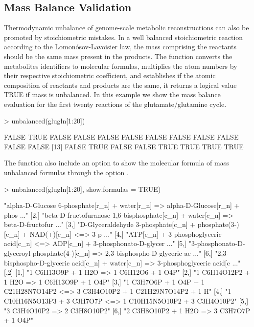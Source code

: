 \subsection{Mass Balance Validation}
Thermodynamic unbalance of genome-scale metabolic reconstructions can also be promoted by stoichiometric mistakes. In a well balanced stoichiometric reaction according to the Lomonósov-Lavoisier law, the mass comprising the reactants should be the same mass present in the products. The  function converts the metabolites identifiers to molecular formulas, multiplies the atom numbers by their respective stoichiometric coefficient, and establishes  if the atomic composition of reactants and products are the same, it returns a logical value TRUE if mass is unbalanced. In this example we show the mass balance evaluation for the first twenty reactions of the glutamate/glutamine cycle.
\begin{Schunk}
\begin{Sinput}
> unbalanced(glugln[1:20])
\end{Sinput}
\begin{Soutput}
 [1] FALSE  TRUE FALSE FALSE FALSE FALSE FALSE FALSE FALSE FALSE FALSE FALSE
[13] FALSE  TRUE FALSE FALSE  TRUE  TRUE  TRUE  TRUE
\end{Soutput}
The  function also include an option to show the molecular formula of mass unbalanced formulas through the option .
\begin{Sinput}
> unbalanced(glugln[1:20], show.formulas = TRUE)
\end{Sinput}
\begin{Soutput}
     [,1]                                                                                                                                                  
[1,] "alpha-D-Glucose 6-phosphate[r_n] + water[r_n] => alpha-D-Glucose[r_n] + phos ..."                                                          
[2,] "beta-D-fructofuranose 1,6-bisphosphate[c_n] + water[c_n] => beta-D-fructofur ..."                             
[3,] "D-Glyceraldehyde 3-phosphate[c_n] + phosphate(3-)[c_n] + NAD(+)[c_n] <=> 3-p ..."
[4,] "ATP[c_n] + 3-phosphoglyceric acid[c_n] <=> ADP[c_n] + 3-phosphonato-D-glycer ..."                                                  
[5,] "3-phosphonato-D-glyceroyl phosphate(4-)[c_n] => 2,3-bisphospho-D-glyceric ac ..."                                                                 
[6,] "2,3-bisphospho-D-glyceric acid[c_n] + water[c_n] => 3-phosphoglyceric acid[c ..."                                                
     [,2]                                                                         
[1,] "1 C6H13O9P + 1 H2O => 1 C6H12O6 + 1 O4P"                                    
[2,] "1 C6H14O12P2 + 1 H2O => 1 C6H13O9P + 1 O4P"                                 
[3,] "1 C3H7O6P + 1 O4P + 1 C21H28N7O14P2 <=> 3 C3H4O10P2 + 1 C21H29N7O14P2 + 1 H"
[4,] "1 C10H16N5O13P3 + 3 C3H7O7P <=> 1 C10H15N5O10P2 + 3 C3H4O10P2"              
[5,] "3 C3H4O10P2 => 2 C3H8O10P2"                                                 
[6,] "2 C3H8O10P2 + 1 H2O => 3 C3H7O7P + 1 O4P"                                   
\end{Soutput}
\end{Schunk}

